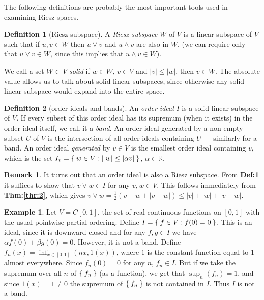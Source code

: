 \documentclass[letterpaper,10pt,oneside,onecolumn,reqno]{amsart}
\newcommand{\R}{\mathbb R}
\theoremstyle{definition}
\newtheorem{defn}{Definition}
\newtheorem{rem}{Remark}
\newtheorem{exa}[thm]{Example}
\newcommand{\meet}{\wedge}
\newcommand{\join}{\vee}
\begin{document}
The following definitions are probably the most important tools used
in examining Riesz spaces.
\begin{framed}
  \begin{defn}[Riesz subspace]\label{def:9}
    A \emph{Riesz subspace} $W$ of $V$ is a
    linear subspace of $V$ such that if $u,v \in W$ then $u \join v$
    and $u \meet v$ are also in $W$. (we can require only that $u
    \join v \in W$, since this implies that $u \meet v \in W$).
  \end{defn}
  We call a set $W \subset V$ \emph{solid} if $w \in W$, $v \in V$ and
  $|v| \leq |w|$, then $v \in W$. The absolute value allows us to talk
  about solid linear subspaces, since otherwise any solid linear
  subspace would expand into the entire space.

  \begin{defn}[order ideals and bands]\label{def:10}
    An \emph{order ideal} $I$ is a solid linear
    subspace of $V$. If every subset of this order ideal has its
    supremum (when it exists) in the order ideal itself, we call it a
    \emph{band}. An order ideal generated by a non-empty
    subset $U$ of $V$ is the intersection of all order ideals
    containing $U$ --- similarly for a band. An order ideal
    \emph{generated} by $v \in V$ is the smallest order ideal
    containing $v$, which is the set $I_{v} = \Set{w \in V: |w| \leq
      |\alpha v|}$, $\alpha \in \R$.
  \end{defn}

  \begin{rem}\label{rem:1}
    It turns out that an order ideal is also a Riesz subspace. From
    \textbf{Def:\ref{def:9}} it suffices to show that $v \join w \in
    I$ for any $v,w \in V$. This follows immediately from
    \textbf{Thm:\ref{thr:2}}, which gives $v \join w =
    \frac{1}{2}(v+w+|v-w|) \leq |v| + |w| + |v - w|$.
  \end{rem}

\begin{exa}
  Let $V=C[0,1]$, the set of real continuous functions on $[0,1]$ with
  the usual pointwise partial ordering. Define $I = \Set{f \in V :
    f(0) = 0}$. This is an ideal, since it is downward closed and for
  any $f,g \in I$ we have $\alpha f(0) + \beta g(0) = 0$. However, it
  is not a band. Define $f_n(x) = \inf_{x \in [0,1]}(nx, 1(x))$, where
  $1$ is the constant function equal to $1$ almost everywhere. Since
  $f_n(0) = 0$ for any $n$, $f_n \in I$. But if we take the supremum
  over all $n$ of $\Set{f_n}$ (as a function), we get that
  $\sup_n({f_n}) = 1$, and since $1(x) = 1 \neq 0$ the supremum of
  $\Set{f_n}$ is not contained in $I$. Thus $I$ is not a band.
\end{exa}


\end{framed}
\end{document}
